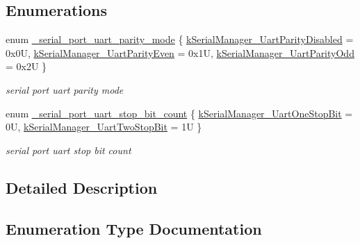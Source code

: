 \subsection*{Enumerations}
\begin{DoxyCompactItemize}
\item 
enum \mbox{\hyperlink{group__serial__port__uart_ga2d84542a7efc9d896f4e8d7221e1ec98}{\+\_\+serial\+\_\+port\+\_\+uart\+\_\+parity\+\_\+mode}} \{ \mbox{\hyperlink{group__serial__port__uart_gga2d84542a7efc9d896f4e8d7221e1ec98a208958aa923a2c50ac1192a5085ab8b1}{k\+Serial\+Manager\+\_\+\+Uart\+Parity\+Disabled}} = 0x0U, 
\mbox{\hyperlink{group__serial__port__uart_gga2d84542a7efc9d896f4e8d7221e1ec98a7d9d6f05fb6e1099fdfbf1f79a699356}{k\+Serial\+Manager\+\_\+\+Uart\+Parity\+Even}} = 0x1U, 
\mbox{\hyperlink{group__serial__port__uart_gga2d84542a7efc9d896f4e8d7221e1ec98a15bc11791c1f07fac71c808d083515db}{k\+Serial\+Manager\+\_\+\+Uart\+Parity\+Odd}} = 0x2U
 \}
\begin{DoxyCompactList}\small\item\em serial port uart parity mode \end{DoxyCompactList}\item 
enum \mbox{\hyperlink{group__serial__port__uart_ga97aea0fa091f5d31407cd8b94bdc5f35}{\+\_\+serial\+\_\+port\+\_\+uart\+\_\+stop\+\_\+bit\+\_\+count}} \{ \mbox{\hyperlink{group__serial__port__uart_gga97aea0fa091f5d31407cd8b94bdc5f35a5caed34146b357a7061aaacfe378e039}{k\+Serial\+Manager\+\_\+\+Uart\+One\+Stop\+Bit}} = 0U, 
\mbox{\hyperlink{group__serial__port__uart_gga97aea0fa091f5d31407cd8b94bdc5f35a83eb7aee91f3fd8964d283c0057880dc}{k\+Serial\+Manager\+\_\+\+Uart\+Two\+Stop\+Bit}} = 1U
 \}
\begin{DoxyCompactList}\small\item\em serial port uart stop bit count \end{DoxyCompactList}\end{DoxyCompactItemize}


\subsection{Detailed Description}


\subsection{Enumeration Type Documentation}
\mbox{\label{group__serial__port__uart_ga2d84542a7efc9d896f4e8d7221e1ec98}} 
